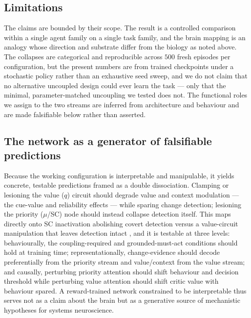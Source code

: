 \subsection{Limitations}
The claims are bounded by their scope. The result is a controlled comparison within a single agent family on a single task family, and the brain mapping is an analogy whose direction and substrate differ from the biology as noted above. The collapses are categorical and reproducible across $500$ fresh episodes per configuration, but the present numbers are from trained checkpoints under a stochastic policy rather than an exhaustive seed sweep, and we do not claim that no alternative uncoupled design could ever learn the task --- only that the minimal, parameter-matched uncoupling we tested does not. The functional roles we assign to the two streams are inferred from architecture and behaviour and are made falsifiable below rather than asserted.

\subsection{The network as a generator of falsifiable predictions}
Because the working configuration is interpretable and manipulable, it yields concrete, testable predictions framed as a double dissociation. Clamping or lesioning the value ($q$) circuit should degrade value and context modulation --- the cue-value and reliability effects --- while sparing change detection; lesioning the priority ($\mu$/SC) node should instead collapse detection itself. This maps directly onto SC inactivation abolishing covert detection versus a value-circuit manipulation that leaves detection intact \citep{katz2025optogenetic, krauzlis2018selective}, and it is testable at three levels: behaviourally, the coupling-required and grounded-must-act conditions should hold at training time; representationally, change-evidence should decode preferentially from the priority stream and value/context from the value stream; and causally, perturbing priority attention should shift behaviour and decision threshold while perturbing value attention should shift critic value with behaviour spared. A reward-trained network constrained to be interpretable thus serves not as a claim about the brain but as a generative source of mechanistic hypotheses for systems neuroscience.

